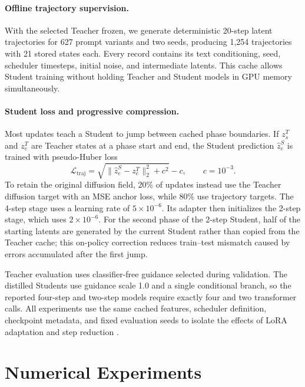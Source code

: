 \documentclass{article}
\begin{document}
\paragraph{Offline trajectory supervision.}
With the selected Teacher frozen, we generate deterministic 20-step latent trajectories for 627 prompt variants and two seeds, producing 1,254 trajectories with 21 stored states each. Every record contains its text conditioning, seed, scheduler timesteps, initial noise, and intermediate latents. This cache allows Student training without holding Teacher and Student models in GPU memory simultaneously.

\paragraph{Student loss and progressive compression.}
Most updates teach a Student to jump between cached phase boundaries. If $z_s^T$ and $z_e^T$ are Teacher states at a phase start and end, the Student prediction $\hat z_e^S$ is trained with pseudo-Huber loss
\begin{equation}
\mathcal{L}_{\mathrm{traj}}
=\sqrt{\|\hat z_e^S-z_e^T\|_2^2+c^2}-c,
\qquad c=10^{-3}.
\end{equation}
To retain the original diffusion field, 20\% of updates instead use the Teacher diffusion target with an MSE anchor loss, while 80\% use trajectory targets. The 4-step stage uses a learning rate of $5\times10^{-6}$. Its adapter then initializes the 2-step stage, which uses $2\times10^{-6}$. For the second phase of the 2-step Student, half of the starting latents are generated by the current Student rather than copied from the Teacher cache; this on-policy correction reduces train--test mismatch caused by errors accumulated after the first jump.

Teacher evaluation uses classifier-free guidance selected during validation. The distilled Students use guidance scale 1.0 and a single conditional branch, so the reported four-step and two-step models require exactly four and two transformer calls. All experiments use the same cached features, scheduler definition, checkpoint metadata, and fixed evaluation seeds to isolate the effects of LoRA adaptation and step reduction \cite{group19repo}.

\section{Numerical Experiments}
\end{document}
